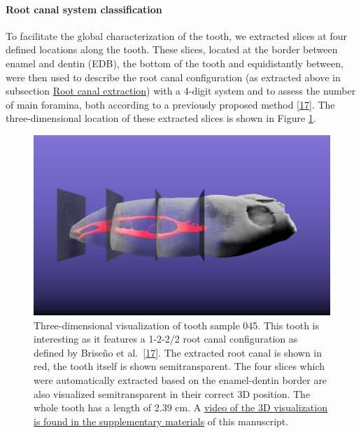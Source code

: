 \documentclass[
  american,
]{article}
\begin{document}
\hypertarget{root-canal-system-classification}{%
\paragraph{Root canal system classification}\label{root-canal-system-classification}}

To facilitate the global characterization of the tooth, we extracted slices at four defined locations along the tooth.
These slices, located at the border between enamel and dentin (EDB), the bottom of the tooth and equidistantly between, were then used to describe the root canal configuration (as extracted above in subsection \protect\hyperlink{root-canal-extraction}{Root canal extraction}) with a 4-digit system and to assess the number of main foramina, both according to a previously proposed method {[}\protect\hyperlink{ref-ZTgDEakx}{17}{]}.
The three-dimensional location of these extracted slices is shown in Figure \ref{fig:3dmevislab}.

\begin{figure}
\hypertarget{fig:3dmevislab}{%
\centering
\includegraphics{images/Tooth045.MeVisLab.png}
\caption{Three-dimensional visualization of tooth sample 045.
This tooth is interesting as it features a 1-2-2/2 root canal configuration as defined by Briseño et al.~{[}\protect\hyperlink{ref-ZTgDEakx}{17}{]}.
The extracted root canal is shown in red, the tooth itself is shown semitransparent.
The four slices which were automatically extracted based on the enamel-dentin border are also visualized semitransparent in their correct 3D position.
The whole tooth has a length of 2.39 cm.
A \href{https://github.com/habi/zmk-tooth-cohort-method-manuscript/blob/master/content/images/tooth045.mp4?raw=true}{video of the 3D visualization is found in the supplementary materials} of this manuscript.}\label{fig:3dmevislab}
}
\end{figure}
\end{document}
